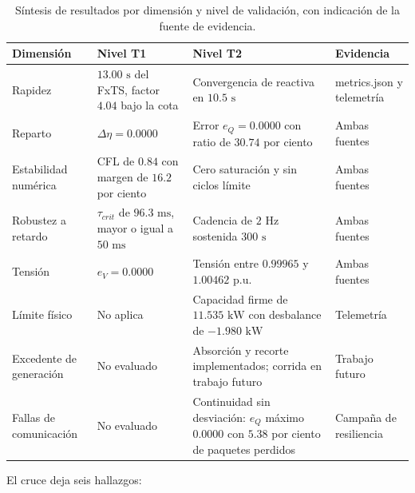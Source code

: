 \begin{table}[H]
    \centering
    \footnotesize
    \caption{Síntesis de resultados por dimensión y nivel de validación, con indicación de la fuente de evidencia.}
    \label{tab:res_sintesis}
    \begin{tabularx}{\textwidth}{|>{\raggedright\arraybackslash}p{2.4cm}|>{\raggedright\arraybackslash}X|>{\raggedright\arraybackslash}X|>{\raggedright\arraybackslash}p{2.8cm}|}
        \hline
        \textbf{Dimensión} & \textbf{Nivel T1} & \textbf{Nivel T2} & \textbf{Evidencia} \\
        \hline
        Rapidez & $13.00\text{ s}$ del FxTS, factor $4.04$ bajo la cota & Convergencia de reactiva en $10.5\text{ s}$ & metrics.json y telemetría \\
        \hline
        Reparto & $\Delta \eta = 0.0000$ & Error $e_Q = 0.0000$ con ratio de $30.74$ por ciento & Ambas fuentes \\
        \hline
        Estabilidad numérica & CFL de $0.84$ con margen de $16.2$ por ciento & Cero saturación y sin ciclos límite & Ambas fuentes \\
        \hline
        Robustez a retardo & $\tau_{crit}$ de $96.3\text{ ms}$, mayor o igual a $50\text{ ms}$ & Cadencia de $2\text{ Hz}$ sostenida $300\text{ s}$ & Ambas fuentes \\
        \hline
        Tensión & $e_V = 0.0000$ & Tensión entre $0.99965$ y $1.00462$ p.u. & Ambas fuentes \\
        \hline
        Límite físico & No aplica & Capacidad firme de $11.535\text{ kW}$ con desbalance de $-1.980\text{ kW}$ & Telemetría \\
        \hline
        Excedente de generación & No evaluado & Absorción y recorte implementados; corrida en trabajo futuro & Trabajo futuro \\
        \hline
        Fallas de comunicación & No evaluado & Continuidad sin desviación: $e_Q$ máximo $0.0000$ con $5.38$ por ciento de paquetes perdidos & Campaña de resiliencia \\
        \hline
    \end{tabularx}
\end{table}


El cruce deja seis hallazgos:

